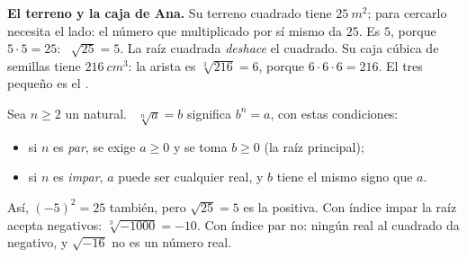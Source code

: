 \documentclass[11pt,a4paper]{article}
\begin{document}
\begin{minipage}[c]{0.6\linewidth}
\textbf{El terreno y la caja de Ana.} Su terreno cuadrado tiene $\SI{25}{m^2}$; para cercarlo necesita el lado: el número
que multiplicado por sí mismo da $25$. Es $5$, porque $5\cdot5=25$: \ $\sqrt{25}=5$. La raíz cuadrada \emph{deshace} el cuadrado.
Su caja cúbica de semillas tiene $\SI{216}{cm^3}$: la arista es $\sqrt[3]{216}=6$, porque $6\cdot6\cdot6=216$. El tres
pequeño es el .
\end{minipage}\hfill
\begin{minipage}[c]{0.36\linewidth}\centering
{}
\end{minipage}

\begin{definicion}
Sea $n\ge2$ un natural. \ $\sqrt[n]{a}=b$ significa $b^{n}=a$, con estas condiciones:
\begin{itemize}
\item si $n$ es \emph{par}, se exige $a\ge0$ y se toma $b\ge0$ (la raíz principal);
\item si $n$ es \emph{impar}, $a$ puede ser cualquier real, y $b$ tiene el mismo signo que $a$.
\end{itemize}
\end{definicion}
Así, $(-5)^{2}=25$ también, pero $\sqrt{25}=5$ es la positiva. Con índice impar la raíz acepta negativos:
$\sqrt[3]{-1000}=-10$. Con índice par no: ningún real al cuadrado da negativo, y $\sqrt{-16}$ no es un número real.
\end{document}
